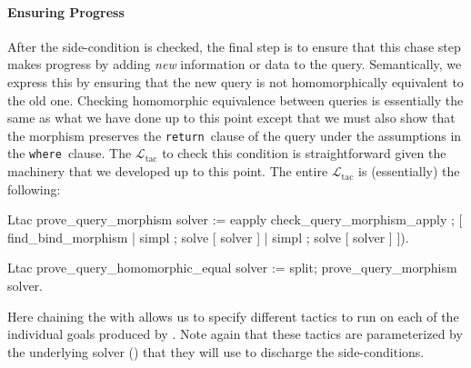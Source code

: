 \documentclass[preprint]{sigplanconf}
\newcommand{\WHERE}{{\tt where}\relax\ifmmode\ \else\xspace\fi}
\newcommand{\RETURN}{{\tt return}\relax\ifmmode\ \else\xspace\fi}
\newcommand{\ltac}[0]{\ensuremath{\mathcal{L}_{\mathrm{tac}}}}
\begin{document}
\paragraph{Ensuring Progress}
After the side-condition is checked, the final step is to ensure that this chase step makes progress by adding \emph{new} information or data to the query.
Semantically, we express this by ensuring that the new query is not homomorphically equivalent to the old one.
Checking homomorphic equivalence between queries is essentially the same as what we have done up to this point except that we must also show that the morphism preserves the \RETURN clause of the query under the assumptions in the \WHERE clause.
The \ltac{} to check this condition is straightforward given the machinery that we developed up to this point.
The entire \ltac{} is (essentially) the following:
\begin{coq}
Ltac prove_query_morphism solver :=
  eapply check_query_morphism_apply ;
    [ find_bind_morphism
    | simpl ; solve [ solver ]
    | simpl ; solve [ solver ] ]).

Ltac prove_query_homomorphic_equal solver :=
  split; prove_query_morphism solver.
\end{coq}
Here chaining the  with \coqe{; [ a | b | c ]} allows us to specify different tactics to run on each of the individual goals produced by .
Note again that these tactics are parameterized by the underlying solver () that they will use to discharge the side-conditions.
\end{document}
